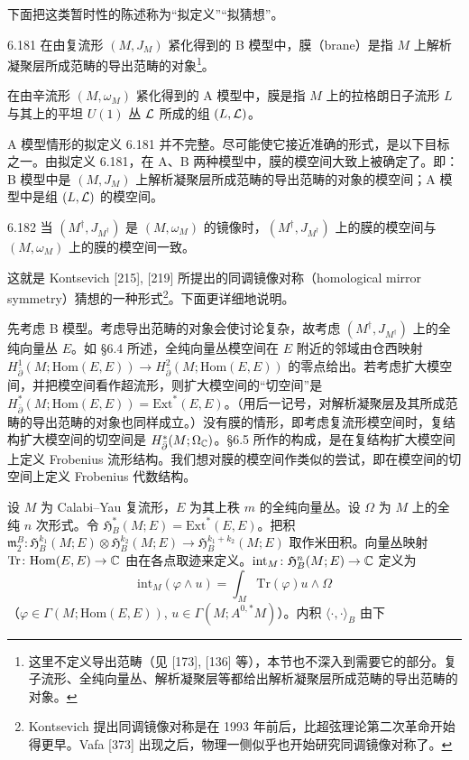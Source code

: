 下面把这类暂时性的陈述称为“拟定义”“拟猜想”。

\begin{definition}{6.181}
  在由复流形 $(M,J_M)$ 紧化得到的 B 模型中，膜（brane）是指 $M$ 上解析凝聚层所成范畴的导出范畴的对象\footnote{这里不定义导出范畴（见 [173], [136] 等），本节也不深入到需要它的部分。复子流形、全纯向量丛、解析凝聚层等都给出解析凝聚层所成范畴的导出范畴的对象。}。

  在由辛流形 $(M,\omega_M)$ 紧化得到的 A 模型中，膜是指 $M$ 上的拉格朗日子流形 $L$ 与其上的平坦 $U(1)$ 丛 $\mathcal{L}$ 所成的组 $(L,\mathcal{L})$。
\end{definition}

A 模型情形的拟定义 6.181 并不完整。尽可能使它接近准确的形式，是以下目标之一。由拟定义 6.181，在 A、B 两种模型中，膜的模空间大致上被确定了。即：B 模型中是 $(M,J_M)$ 上解析凝聚层所成范畴的导出范畴的对象的模空间；A 模型中是组 $(L,\mathcal{L})$ 的模空间。

\begin{conjecture}{6.182}
  当 $(M^\dagger,J_{M^\dagger})$ 是 $(M,\omega_M)$ 的镜像时，$(M^\dagger,J_{M^\dagger})$ 上的膜的模空间与 $(M,\omega_M)$ 上的膜的模空间一致。
\end{conjecture}

这就是 Kontsevich [215], [219] 所提出的同调镜像对称（homological mirror symmetry）猜想的一种形式\footnote{Kontsevich 提出同调镜像对称是在 1993 年前后，比超弦理论第二次革命开始得更早。Vafa [373] 出现之后，物理一侧似乎也开始研究同调镜像对称了。}。下面更详细地说明。

先考虑 B 模型。考虑导出范畴的对象会使讨论复杂，故考虑 $(M^\dagger,J_{M^\dagger})$ 上的全纯向量丛 $E$。如 §6.4 所述，全纯向量丛模空间在 $E$ 附近的邻域由仓西映射 $H^1_{\bar\partial}(M;\mathrm{Hom}(E,E))\to H^2_{\bar\partial}(M;\mathrm{Hom}(E,E))$ 的零点给出。若考虑扩大模空间，并把模空间看作超流形，则扩大模空间的“切空间”是 $H^*_{\bar\partial}(M;\mathrm{Hom}(E,E))=\mathrm{Ext}^*(E,E)$。（用后一记号，对解析凝聚层及其所成范畴的导出范畴的对象也同样成立。）没有膜的情形，即考虑复流形模空间时，复结构扩大模空间的切空间是 $H^*_{\bar\partial}(M;\Omega_{\mathbb{C}})$。§6.5 所作的构成，是在复结构扩大模空间上定义 Frobenius 流形结构。我们想对膜的模空间作类似的尝试，即在模空间的切空间上定义 Frobenius 代数结构。

设 $M$ 为 Calabi–Yau 复流形，$E$ 为其上秩 $m$ 的全纯向量丛。设 $\Omega$ 为 $M$ 上的全纯 $n$ 次形式。令 $\mathfrak{H}^*_B(M;E)=\mathrm{Ext}^*(E,E)$。把积 $\mathfrak{m}^B_2\colon\mathfrak{H}^{k_1}_B(M;E)\otimes\mathfrak{H}^{k_2}_B(M;E)\to\mathfrak{H}^{k_1+k_2}_B(M;E)$ 取作米田积。向量丛映射 $\mathrm{Tr}\colon\mathrm{Hom}(E,E)\to\mathbb{C}$ 由在各点取迹来定义。$\mathrm{int}_M\colon\mathfrak{H}^n_B(M;E)\to\mathbb{C}$ 定义为
\[
  \mathrm{int}_M(\varphi\wedge u)=\int_M\mathrm{Tr}(\varphi)u\wedge\Omega
\]
（$\varphi\in\Gamma(M;\mathrm{Hom}(E,E))$, $u\in\Gamma(M;A^{0,*}M)$）。内积 $\langle\cdot,\cdot\rangle_B$ 由下

